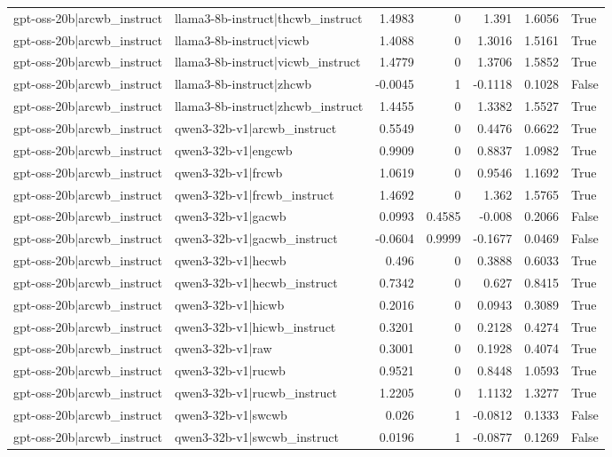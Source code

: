 \begin{table}
\begin{tabular}{l l r r r r l}
gpt-oss-20b|arcwb_instruct & llama3-8b-instruct|thcwb_instruct & 1.4983 & 0 & 1.391 & 1.6056 & True \\
gpt-oss-20b|arcwb_instruct & llama3-8b-instruct|vicwb & 1.4088 & 0 & 1.3016 & 1.5161 & True \\
gpt-oss-20b|arcwb_instruct & llama3-8b-instruct|vicwb_instruct & 1.4779 & 0 & 1.3706 & 1.5852 & True \\
gpt-oss-20b|arcwb_instruct & llama3-8b-instruct|zhcwb & -0.0045 & 1 & -0.1118 & 0.1028 & False \\
gpt-oss-20b|arcwb_instruct & llama3-8b-instruct|zhcwb_instruct & 1.4455 & 0 & 1.3382 & 1.5527 & True \\
gpt-oss-20b|arcwb_instruct & qwen3-32b-v1|arcwb_instruct & 0.5549 & 0 & 0.4476 & 0.6622 & True \\
gpt-oss-20b|arcwb_instruct & qwen3-32b-v1|engcwb & 0.9909 & 0 & 0.8837 & 1.0982 & True \\
gpt-oss-20b|arcwb_instruct & qwen3-32b-v1|frcwb & 1.0619 & 0 & 0.9546 & 1.1692 & True \\
gpt-oss-20b|arcwb_instruct & qwen3-32b-v1|frcwb_instruct & 1.4692 & 0 & 1.362 & 1.5765 & True \\
gpt-oss-20b|arcwb_instruct & qwen3-32b-v1|gacwb & 0.0993 & 0.4585 & -0.008 & 0.2066 & False \\
gpt-oss-20b|arcwb_instruct & qwen3-32b-v1|gacwb_instruct & -0.0604 & 0.9999 & -0.1677 & 0.0469 & False \\
gpt-oss-20b|arcwb_instruct & qwen3-32b-v1|hecwb & 0.496 & 0 & 0.3888 & 0.6033 & True \\
gpt-oss-20b|arcwb_instruct & qwen3-32b-v1|hecwb_instruct & 0.7342 & 0 & 0.627 & 0.8415 & True \\
gpt-oss-20b|arcwb_instruct & qwen3-32b-v1|hicwb & 0.2016 & 0 & 0.0943 & 0.3089 & True \\
gpt-oss-20b|arcwb_instruct & qwen3-32b-v1|hicwb_instruct & 0.3201 & 0 & 0.2128 & 0.4274 & True \\
gpt-oss-20b|arcwb_instruct & qwen3-32b-v1|raw & 0.3001 & 0 & 0.1928 & 0.4074 & True \\
gpt-oss-20b|arcwb_instruct & qwen3-32b-v1|rucwb & 0.9521 & 0 & 0.8448 & 1.0593 & True \\
gpt-oss-20b|arcwb_instruct & qwen3-32b-v1|rucwb_instruct & 1.2205 & 0 & 1.1132 & 1.3277 & True \\
gpt-oss-20b|arcwb_instruct & qwen3-32b-v1|swcwb & 0.026 & 1 & -0.0812 & 0.1333 & False \\
gpt-oss-20b|arcwb_instruct & qwen3-32b-v1|swcwb_instruct & 0.0196 & 1 & -0.0877 & 0.1269 & False \\

\end{tabular}
\end{table}
